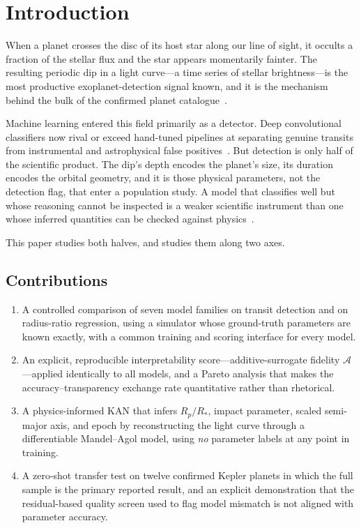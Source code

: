\documentclass[manuscript,nonacm]{acmart}
\begin{document}
\section{Introduction}
When a planet crosses the disc of its host star along our line of sight, it
occults a fraction of the stellar flux and the star appears momentarily fainter. The
resulting periodic dip in a light curve---a time series of stellar
brightness---is the most productive exoplanet-detection signal known, and it is the
mechanism behind the bulk of the confirmed planet
catalogue~\cite{borucki2010kepler,ricker2015tess}.

Machine learning entered this field primarily as a detector. Deep convolutional
classifiers now rival or exceed hand-tuned pipelines at separating genuine transits from
instrumental and astrophysical false positives~\cite{shallue2018,pearson2018}. But
detection is only half of the scientific product. The dip's depth encodes the planet's
size, its duration encodes the orbital geometry, and it is those physical parameters,
not the detection flag, that enter a population study. A model that classifies well but
whose reasoning cannot be inspected is a weaker scientific instrument than one whose
inferred quantities can be checked against physics~\cite{rudin2019stop}.

This paper studies both halves, and studies them along two axes.

\subsection{Contributions}
\begin{enumerate}
\item A controlled comparison of seven model families on transit detection and on
      radius-ratio regression, using a simulator whose ground-truth parameters are known
      exactly, with a common training and scoring interface for every model.
\item An explicit, reproducible interpretability score---additive-surrogate fidelity
      $\mathcal{A}$---applied identically to all models, and a Pareto analysis that makes
      the accuracy--transparency exchange rate quantitative rather than rhetorical.
\item A physics-informed KAN that infers $R_p/R_*$, impact parameter, scaled semi-major
      axis, and epoch by reconstructing the light curve through a differentiable
      Mandel--Agol model, using \emph{no} parameter labels at any point in training.
\item A zero-shot transfer test on twelve confirmed Kepler planets in which the
      full sample is the primary reported result, and an explicit demonstration that the
      residual-based quality screen used to flag model mismatch is not aligned with
      parameter accuracy.
\end{enumerate}
\end{document}
